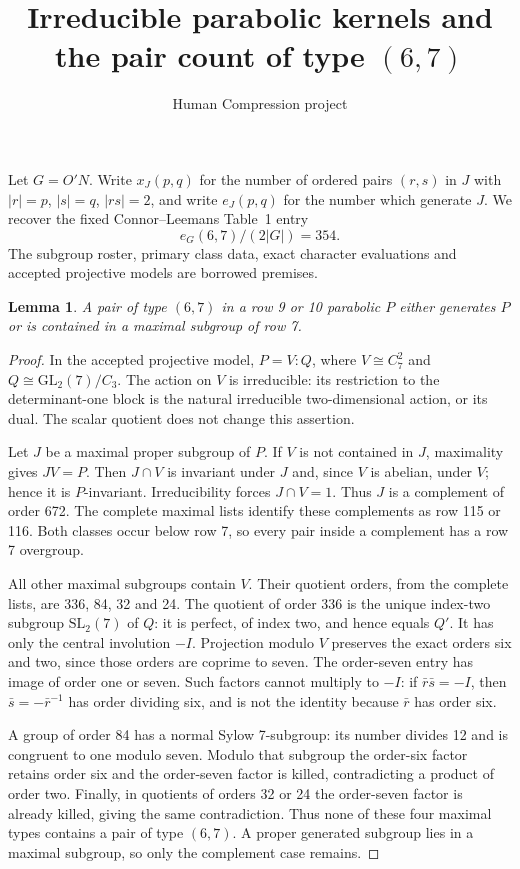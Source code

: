 \documentclass[11pt,a4paper]{article}
\title{Irreducible parabolic kernels and the pair count of type $(6,7)$}
\author{Human Compression project}\date{}
\newtheorem{lemma}{Lemma}\newtheorem{theorem}{Theorem}
\begin{document}
\maketitle
Let $G=O'N$. Write $x_J(p,q)$ for the number of ordered pairs
$(r,s)$ in $J$ with $|r|=p$, $|s|=q$, $|rs|=2$, and write $e_J(p,q)$
for the number which generate $J$. We recover the fixed
Connor--Leemans Table~1 entry
\[                         e_G(6,7)/(2|G|)=354.                \tag{1}\]
The subgroup roster, primary class data, exact character evaluations
and accepted projective models are borrowed premises.

\begin{lemma}\label{parabolic}
A pair of type $(6,7)$ in a row 9 or 10 parabolic $P$ either generates
$P$ or is contained in a maximal subgroup of row 7.
\end{lemma}
\begin{proof}
In the accepted projective model, $P=V:Q$, where $V\cong C_7^2$ and
$Q\cong\mathrm{GL}_2(7)/C_3$. The action on $V$ is irreducible:
its restriction to the determinant-one block is the natural
irreducible two-dimensional action, or its dual. The scalar quotient
does not change this assertion.

Let $J$ be a maximal proper subgroup of $P$. If $V$ is not contained
in $J$, maximality gives $JV=P$. Then $J\cap V$ is invariant under
$J$ and, since $V$ is abelian, under $V$; hence it is $P$-invariant.
Irreducibility forces $J\cap V=1$. Thus $J$ is a complement of
order 672. The complete maximal lists identify these complements
as row 115 or 116. Both classes occur below row 7, so every pair
inside a complement has a row 7 overgroup.

All other maximal subgroups contain $V$. Their quotient orders,
from the complete lists, are 336, 84, 32 and 24. The quotient of
order 336 is the unique index-two subgroup
$\mathrm{SL}_2(7)$ of $Q$: it is perfect, of index two, and hence
equals $Q'$. It has only the central involution $-I$.
Projection modulo $V$ preserves the exact orders six and two,
since those orders are coprime to seven. The order-seven entry has
image of order one or seven. Such factors cannot multiply to $-I$:
if $\bar r\bar s=-I$, then $\bar s=-\bar r^{-1}$ has order dividing
six, and is not the identity because $\bar r$ has order six.

A group of order 84 has a normal Sylow 7-subgroup: its number divides
12 and is congruent to one modulo seven. Modulo that subgroup the
order-six factor retains order six and the order-seven factor is
killed, contradicting a product of order two. Finally, in quotients
of orders 32 or 24 the order-seven factor is already killed, giving
the same contradiction. Thus none of these four maximal types
contains a pair of type $(6,7)$. A proper generated subgroup lies
in a maximal subgroup, so only the complement case remains.
\end{proof}
\end{document}
